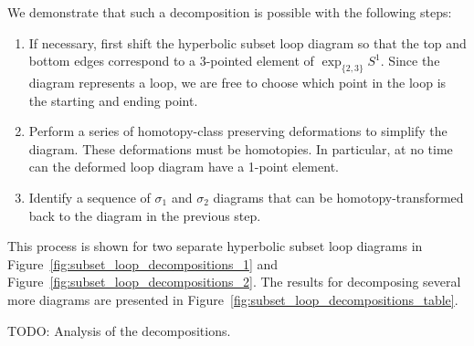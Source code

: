 \documentclass[12pt,twoside]{reedthesis}
\theoremstyle{definition}
\newcommand{\exptwothree}{\exp_{\{2,3\}}}
\newcommand{\TODO}[1]{{\color{todopink}\textsf{TODO: #1}}}
\begin{document}
We demonstrate that such a decomposition is possible with the following steps:
\begin{enumerate}[1.]
  \item If necessary, first shift the hyperbolic subset loop diagram so that the top and bottom edges correspond to a 3-pointed element of $\exptwothree S^1$.
  Since the diagram represents a loop, we are free to choose which point in the loop is the starting and ending point.

  \item Perform a series of homotopy-class preserving deformations to simplify the diagram.
  These deformations must be homotopies. In particular, at no time can the deformed loop diagram have a 1-point element. 

  \item Identify a sequence of $\sigma_1$ and $\sigma_2$ diagrams that can be homotopy-transformed back to the diagram in the previous step.
\end{enumerate}

This process is shown for two separate hyperbolic subset loop diagrams in Figure~\ref{fig:subset_loop_decompositions_1} and Figure~\ref{fig:subset_loop_decompositions_2}.
The results for decomposing several more diagrams are presented in Figure~\ref{fig:subset_loop_decompositions_table}.

\TODO{Analysis of the decompositions.}
\end{document}
